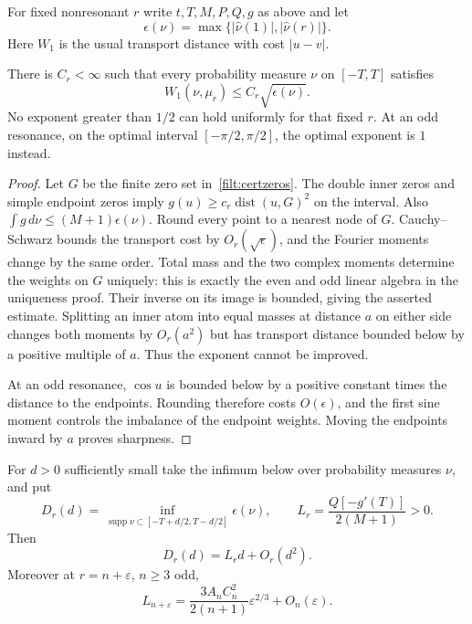 For fixed nonresonant $r$ write $t,T,M,P,Q,g$ as above and let
\[
 \epsilon(\nu)=\max\{|\widehat\nu(1)|,|\widehat\nu(r)|\}.
\]
Here $W_1$ is the usual transport distance with cost $|u-v|$.

\begin{proposition}\label{filt:stability}
There is $C_r<\infty$ such that every probability measure $\nu$ on
$[-T,T]$ satisfies
\[
 W_1(\nu,\mu_r)\le C_r\sqrt{\epsilon(\nu)}.
\]
No exponent greater than $1/2$ can hold uniformly for that fixed $r$.
At an odd resonance, on the optimal interval $[-\pi/2,\pi/2]$, the optimal
exponent is $1$ instead.
\end{proposition}

\begin{proof}
Let $G$ be the finite zero set in~\eqref{filt:certzeros}.  The double inner
zeros and simple endpoint zeros imply
$g(u)\ge c_r\operatorname{dist}(u,G)^2$ on the interval.  Also
$\int g\,d\nu\le(M+1)\epsilon(\nu)$.
Round every point to a nearest node of $G$.  Cauchy--Schwarz bounds the
transport cost by $O_r(\sqrt{\epsilon})$, and the Fourier moments change
by the same order.  Total mass and the two complex moments determine the
weights on $G$ uniquely: this is exactly the even and odd linear algebra
in the uniqueness proof.  Their inverse on its image is bounded, giving
the asserted estimate.  Splitting an inner atom into equal masses at
distance $a$ on either side changes both moments by $O_r(a^2)$ but has
transport distance bounded below by a positive multiple of $a$.  Thus the
exponent cannot be improved.

At an odd resonance, $\cos u$ is bounded below by a positive constant times
the distance to the endpoints.  Rounding therefore costs $O(\epsilon)$,
and the first sine moment controls the imbalance of the endpoint weights.
Moving the endpoints inward by $a$ proves sharpness.
\end{proof}

\begin{theorem}\label{filt:shortening}
For $d>0$ sufficiently small take the infimum below over probability
measures $\nu$, and put
\[
 D_r(d)=\inf_{\operatorname{supp}\nu\subset[-T+d/2,T-d/2]}
             \epsilon(\nu),
 \qquad
 L_r=\frac{Q[-g'(T)]}{2(M+1)}>0.
\]
Then
\begin{equation}\label{filt:shorteninglaw}
 D_r(d)=L_rd+O_r(d^2).
\end{equation}
Moreover at $r=n+\varepsilon$, $n\ge3$ odd,
\begin{equation}\label{filt:leakcusp}
 L_{n+\varepsilon}
  =\frac{3A_nC_n^2}{2(n+1)}\varepsilon^{2/3}
          +O_n(\varepsilon).
\end{equation}
\end{theorem}


